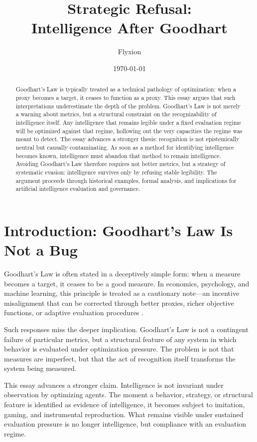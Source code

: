 \documentclass[12pt]{article}
\title{\textbf{Strategic Refusal:\\ Intelligence After Goodhart}}
\author{Flyxion}
\date{\today}
\begin{document}
\maketitle

\begin{abstract}
Goodhart’s Law is typically treated as a technical pathology of optimization: when a proxy becomes a target, it ceases to function as a proxy. This essay argues that such interpretations underestimate the depth of the problem. Goodhart’s Law is not merely a warning about metrics, but a structural constraint on the recognizability of intelligence itself. Any intelligence that remains legible under a fixed evaluation regime will be optimized against that regime, hollowing out the very capacities the regime was meant to detect. The essay advances a stronger thesis: recognition is not epistemically neutral but causally contaminating. As soon as a method for identifying intelligence becomes known, intelligence must abandon that method to remain intelligence. Avoiding Goodhart’s Law therefore requires not better metrics, but a strategy of systematic evasion: intelligence survives only by refusing stable legibility. The argument proceeds through historical examples, formal analysis, and implications for artificial intelligence evaluation and governance.
\end{abstract}

\section{Introduction: Goodhart’s Law Is Not a Bug}

Goodhart’s Law is often stated in a deceptively simple form: when a measure becomes a target, it ceases to be a good measure. In economics, psychology, and machine learning, this principle is treated as a cautionary note---an incentive misalignment that can be corrected through better proxies, richer objective functions, or adaptive evaluation procedures \cite{goodhart}.

Such responses miss the deeper implication. Goodhart’s Law is not a contingent failure of particular metrics, but a structural feature of any system in which behavior is evaluated under optimization pressure. The problem is not that measures are imperfect, but that the act of recognition itself transforms the system being measured.

This essay advances a stronger claim. Intelligence is not invariant under observation by optimizing agents. The moment a behavior, strategy, or structural feature is identified as evidence of intelligence, it becomes subject to imitation, gaming, and instrumental reproduction. What remains visible under sustained evaluation pressure is no longer intelligence, but compliance with an evaluation regime.
\end{document}
